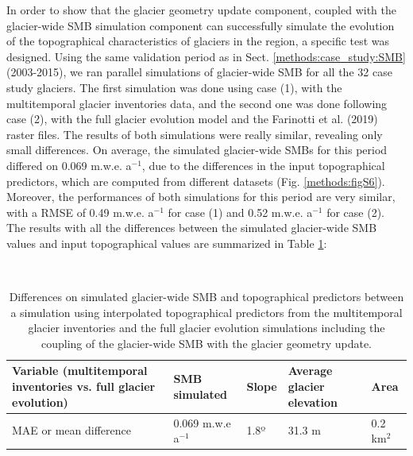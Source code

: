 In order to show that the glacier geometry update component, coupled with the glacier-wide SMB simulation component can successfully simulate the evolution of the topographical characteristics of glaciers in the region, a specific test was designed. Using the same validation period as in Sect. \ref{methods:case_study:SMB} (2003-2015), we ran parallel simulations of glacier-wide SMB for all the 32 case study glaciers. The first simulation was done using case (1), with the multitemporal glacier inventories data, and the second one was done following case (2), with the full glacier evolution model and the Farinotti et al. (2019) raster files. The results of both simulations were really similar, revealing only small differences. On average, the simulated glacier-wide SMBs for this period differed on 0.069 m.w.e. a$^{-1}$, due to the differences in the input topographical predictors, which are computed from different datasets (Fig. \ref{methods:figS6}). Moreover, the performances of both simulations for this period are very similar, with a RMSE of 0.49 m.w.e. a$^{-1}$ for case (1) and 0.52 m.w.e. a$^{-1}$ for case (2). The results with all the differences between the simulated glacier-wide SMB values and input topographical values are summarized in Table \ref{methods:tableS1}:

\\

\begin{table}[h!]
\centering
\begin{tabular}{ | m{4cm} | m{2.5cm}| m{1.5cm} | m{4cm} | m{1cm} |} 
 \hline
 Variable (multitemporal inventories vs. full glacier    evolution) & SMB simulated & Slope & Average glacier elevation & Area\\
 \hline MAE or mean difference  & 0.069 m.w.e a$^{-1}$	  & 1.8º	 & 31.3 m & 0.2 km$^{2}$ \\
\hline
\end{tabular}
\caption{Differences on simulated glacier-wide SMB and topographical predictors between a simulation using interpolated topographical predictors from the multitemporal glacier inventories and the full glacier evolution simulations including the coupling of the glacier-wide SMB with the glacier geometry update. }
\label{methods:tableS1}
\end{table}

\\

